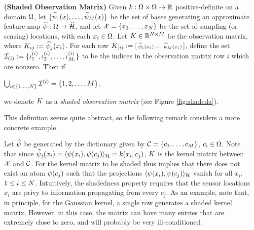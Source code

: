 \begin{definition}\label{def:shaded}
\textbf{(Shaded Observation Matrix)} Given $k:\Omega\times\Omega\to\mathbb{R}$ positive-definite on a domain $\Omega$, let $\{\widehat{\psi}_1(x), \dots, \widehat{\psi}_{M}(x)\}$ be the set of bases generating an approximate feature map $\widehat{\psi}:\Omega\to\widehat{\mathcal{H}}$, and let
$\mathcal{X} = \{x_1, \dots, x_{N}\}$ be the set of sampling (or sensing) locations, with each $x_i\in\Omega$. 
Let $K\in\mathbb{R}^{N\times M}$ be the observation matrix, where $ K_{ij} := \widehat{\psi}_j(x_i)$. For each
row $K_{(i)} := \left[\begin{smallmatrix}
  \widehat{\psi}_1(x_i) & \cdots & \widehat{\psi}_{M}(x_i)
 \end{smallmatrix}\right]$, define the set 
$\mathcal{I}_{(i)} := \{\iota_1^{(i)},\iota_2^{(i)},\dots, \iota_{M_i}^{(i)}\}$ to be the indices in the observation
matrix row $i$ which are nonzero. 
Then if 

$\bigcup_{i\in\{1,\dots,N\}} \mathcal{I}^{(i)} = \{1,2,\dots, M\}$,

we denote $K$ as a \emph{shaded observation matrix} (see Figure \ref{fig:shadeda}).
\end{definition}

This definition seems quite abstract, so the following remark considers a more concrete example.

\begin{remark}\label{rem:shaded}
 Let $\widehat{\psi}$ be generated by the dictionary given by $\mathcal{C} = \{c_1,\dots,c_{M}\}$, $c_i\in\Omega$. Note that since $\widehat{\psi}_j(x_i) = \langle\psi(x_i), \psi(c_j)\rangle_{\mathcal{H}} = k(x_i,c_j)$, $K$ is the kernel matrix between $\mathcal{X}$ and $\mathcal{C}$. For the kernel matrix to be shaded thus implies that there does not exist an atom $\psi(c_j)$ such that the projections $\langle\psi(x_i),\psi(c_j)\rangle_{\mathcal{H}}$ vanish for all $x_i$, $1\leq i\leq N$. Intuitively, the shadedness property requires that the sensor locations $x_i$ are privy to information propagating from every $c_j$. As an example, note that, in principle, for the Gaussian kernel, a single row generates a shaded kernel matrix. However, in this case, the matrix can have many entries that are extremely close to zero, and will probably be very ill-conditioned.  
\end{remark}


